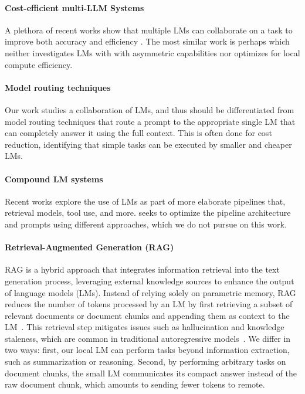 

\paragraph{Cost-efficient multi-LLM Systems} 
A plethora of recent works show that multiple LMs can collaborate on a task to improve both accuracy and efficiency \citep{guo2024large}. The most similar work is perhaps \citep{wang2024mixture} which neither investigates LMs with with asymmetric capabilities nor optimizes for local compute efficiency. 


\paragraph{Model routing techniques} Our work studies a collaboration of LMs, and thus should be differentiated from model routing techniques \citep{chen2024more,chen2023frugalgpt} that route a prompt to the appropriate single LM that can completely answer it using the full context. This is often done for cost reduction, identifying that simple tasks can be executed by smaller and cheaper LMs. 

\paragraph{Compound LM systems} Recent works explore the use of LMs as part of more elaborate pipelines that, retrieval models, tool use, and more. \citep{saad2024archon,khattab2023dspy,yuksekgonul2024textgrad} seeks to optimize the pipeline architecture and prompts using different approaches, which we do not pursue on this work.

\paragraph{Retrieval-Augmented Generation (RAG)} RAG is a hybrid approach that integrates information retrieval into the text generation process, leveraging external knowledge sources to enhance the output of language models (LMs). Instead of relying solely on parametric memory, RAG reduces the number of tokens processed by an LM by first retrieving a subset of relevant documents or document chunks and appending them as context to the LM~\citep{lewis2020retrieval, karpukhin2020dense, lee2019latent, izacard2021unsupervised, guu2020retrieval}. This retrieval step mitigates issues such as hallucination and knowledge staleness, which are common in traditional autoregressive models~\citep{shuster2021retrieval, petroni2019language}. We differ in two ways: first, our local LM can perform tasks beyond information extraction, such as summarization or reasoning. Second, by performing arbitrary tasks on document chunks, the small LM communicates its compact answer instead of the raw document chunk, which amounts to sending fewer tokens to remote.



